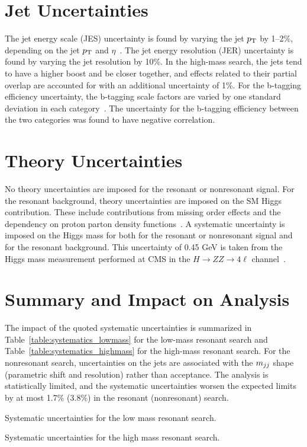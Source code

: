 \section{Jet Uncertainties\label{sec:jetunc}}

The jet energy scale (JES) uncertainty is found by varying the jet $p_{\rm T}$ by 1--2\%,
depending on the jet $p_{\rm T}$ and $\eta$~\cite{JINST6}.
The jet energy resolution (JER) uncertainty is found by varying the jet resolution by 10\%.
In the high-mass search, the jets tend to have a higher boost and be closer together,
and effects related to their partial overlap are accounted for with an additional uncertainty of 1\%.
For the b-tagging efficiency uncertainty, the b-tagging scale factors are varied by one standard
deviation in each category~\cite{BTV}. 
The uncertainty for the b-tagging efficiency between the two categories
was found to have negative correlation.

\section{Theory Uncertainties\label{sec:theoryunc}}

No theory uncertainties are imposed for the resonant or nonresonant signal.
For the resonant background, theory uncertainties are imposed on the SM Higgs contribution. These
include contributions from missing order effects and the dependency on proton parton density
functions~\cite{Dittmaier:2011ti,LHC:SMHiggsBR}.
A systematic uncertainty is imposed on the Higgs mass for both for the resonant or nonresonant signal
and for the resonant background.
This uncertainty of 0.45 GeV is taken from the Higgs mass measurement performed at CMS in the
$H\rightarrow ZZ \rightarrow 4\ell$ channel~\cite{Chatrchyan:2013mxa}.

\section{Summary and Impact on Analysis\label{sec:uncimpact}}

The impact of the quoted systematic uncertainties is summarized in
Table~\ref{table:systematics_lowmass} for the low-mass resonant search and
Table~\ref{table:systematics_highmass} for the high-mass resonant search.
For the nonresonant search, uncertainties on the jets are
associated with the $m_{jj}$ shape (parametric shift and resolution) rather than acceptance.
The analysis is statistically limited, and the systematic uncertainties worsen the expected limits
by at most 1.7\% (3.8\%) in the resonant (nonresonant) search.

\begin{table}[htbp!]
  \centering
  \renewcommand{\arraystretch}{1.4}
  \caption{Systematic uncertainties for the low mass resonant search.}
  
  \label{table:systematics_lowmass}
\end{table}

\begin{table}[htbp!]
  \centering
  \renewcommand{\arraystretch}{1.4}
  \caption{Systematic uncertainties for the high mass resonant search.}
  
  \label{table:systematics_highmass}
\end{table}
